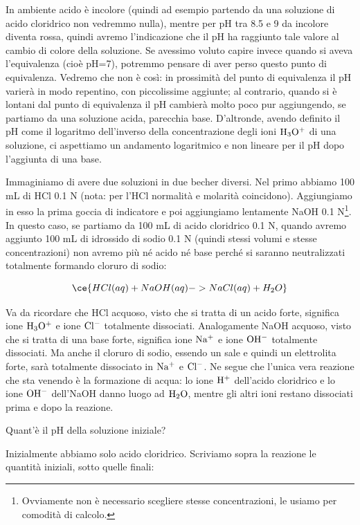 In ambiente acido è incolore (quindi ad esempio partendo da una soluzione di acido cloridrico non vedremmo nulla), mentre per pH tra 8.5 e 9 da incolore diventa rossa, quindi avremo l'indicazione che il pH ha raggiunto tale valore al cambio di colore della soluzione. Se avessimo voluto capire invece quando si aveva l'equivalenza (cioè pH=7), potremmo pensare di aver perso questo punto di equivalenza. Vedremo che non è così: in prossimità del punto di equivalenza il pH varierà in modo repentino, con piccolissime aggiunte; al contrario, quando si è lontani dal punto di equivalenza il pH cambierà molto poco pur aggiungendo, se partiamo da una soluzione acida, parecchia base. D'altronde, avendo definito il pH come il logaritmo dell'inverso della concentrazione degli ioni $\rm H_3O^+$ di una soluzione, ci aspettiamo un andamento logaritmico e non lineare per il pH dopo l'aggiunta di una base.

\vspace{0.2cm}Immaginiamo di avere due soluzioni in due becher diversi. Nel primo abbiamo 100 mL di HCl 0.1 N (nota: per l'HCl normalità e molarità coincidono). Aggiungiamo in esso la prima goccia di indicatore e poi aggiungiamo lentamente NaOH 0.1 N\footnote{Ovviamente non è necessario scegliere stesse concentrazioni, le usiamo per comodità di calcolo.}. In questo caso, se partiamo da 100 mL di acido cloridrico 0.1 N, quando avremo aggiunto 100 mL di idrossido di sodio 0.1 N (quindi stessi volumi e stesse concentrazioni) non avremo più né acido né base perché si saranno neutralizzati totalmente formando cloruro di sodio:

$$\ce{HCl(aq) + NaOH(aq) -> NaCl(aq) + H_2O}$$

Va da ricordare che HCl acquoso, visto che si tratta di un acido forte, significa ione $\rm H_3O^+$ e ione $\rm Cl^-$ totalmente dissociati. Analogamente NaOH acquoso, visto che si tratta di una base forte, significa ione $\rm Na^+$ e ione $\rm OH^-$ totalmente dissociati. Ma anche il cloruro di sodio, essendo un sale e quindi un elettrolita forte, sarà totalmente dissociato in $\rm Na^+$ e $\rm Cl^-$. Ne segue che l'unica vera reazione che sta venendo è la formazione di acqua: lo ione $\rm H^+$ dell'acido cloridrico e lo ione $\rm OH^-$ dell'NaOH danno luogo ad $\rm H_2O$, mentre gli altri ioni restano dissociati prima e dopo la reazione.

Quant'è il pH della soluzione iniziale?

Inizialmente abbiamo solo acido cloridrico. Scriviamo sopra la reazione le quantità iniziali, sotto quelle finali:

